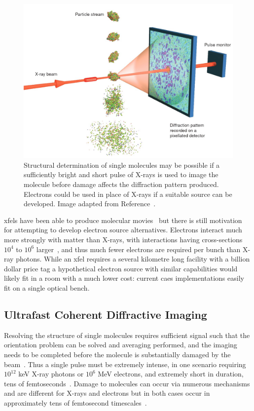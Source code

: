 \begin{figure}
    \center
    \includegraphics[width=0.65\linewidth]{0intro/Figs/single_molecule_cdi.jpg}
    \caption[Structural determination of single molecules.]{Structural determination of single molecules may be possible if a sufficiently bright and short pulse of X-rays is used to image the molecule before damage affects the diffraction pattern produced. Electrons could be used in place of X-rays if a suitable source can be developed. Image adapted from Reference~\cite{gaffney_imaging_2007}.}
    \label{figure:molecule_cdi}
\end{figure}

\Glspl{xfel} have been able to produce molecular movies~\cite{kupitz_structural_2016,pande_femtosecond_2016,nango_three-dimensional_2016} but there is still motivation for attempting to develop electron source alternatives.
Electrons interact much more strongly with matter than X-rays, with interactions having cross-sections $10^4$ to $10^6$ larger~\cite{sciaini_femtosecond_2011}, and thus much fewer electrons are required per bunch than X-ray photons.
While an \gls{xfel} requires a several kilometre long facility with a billion dollar price tag a hypothetical electron source with similar capabilities would likely fit in a room with a much lower cost: current \gls{caes} implementations easily fit on a single optical bench.

\subsection{Ultrafast Coherent Diffractive Imaging}

Resolving the structure of single molecules requires sufficient signal such that the orientation problem can be solved and averaging performed, and the imaging needs to be completed before the molecule is substantially damaged by the beam~\cite{huldt_diffraction_2003}.
Thus a single pulse must be extremely intense, in one scenario requiring $10^{12}$ \unit[8]{keV} X-ray photons or $10^6$ \unit[3]{MeV} electrons, and extremely short in duration, tens of femtoseconds~\cite{chapman_femtosecond_2006,spence_outrunning_2017}.
Damage to molecules can occur via numerous mechanisms and are different for X-rays and electrons but in both cases occur in approximately tens of femtosecond timescales~\cite{spence_outrunning_2017}.

